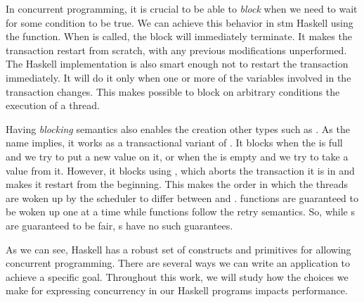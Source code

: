 In concurrent programming, it is crucial to be able to \emph{block} when we need to wait for some condition to be true. We can achieve this behavior in \acs{stm} Haskell using the \retry function. When \retry is called, the \atomically block will immediately terminate. It makes the transaction restart from scratch, with any previous modifications unperformed. The Haskell implementation is also smart enough not to restart the transaction immediately. It will do it only when one or more of the variables involved in the transaction changes. This makes possible to block on arbitrary conditions the execution of a thread.

Having \emph{blocking} semantics also enables the creation other types such as \TMVar. As the name implies, it works as a transactional variant of \MVar. It blocks when the \TMVar is full and we try to put a new value on it, or when the \TMVar is empty and we try to take a value from it. However, it blocks using \retry, which aborts the transaction it is in and makes it restart from the beginning. This makes the order in which the threads are woken up by the scheduler to differ between \MVar and \TMVar. \MVar functions are guaranteed to be woken up one at a time while \TMVar functions follow the retry semantics. So, while {\MVar}s are guaranteed to be fair, {\TMVar}s have no such guarantees.

As we can see, Haskell has a robust set of constructs and primitives for allowing concurrent programming. There are several ways we can write an application to achieve a specific goal. Throughout this work, we will study how the choices we make for expressing concurrency in our Haskell programs impacts performance.
